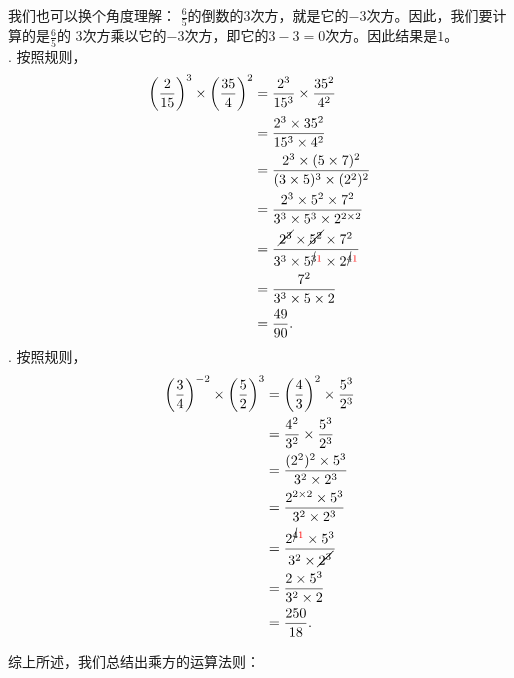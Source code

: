 \documentclass[12pt,UTF8,fontset=none]{ctexbook}
\begin{document}
\begin{so}
    我们也可以换个角度理解：
    $\frac{6}{5}$的倒数的$3$次方，就是它的$-3$次方。因此，我们要计算的是$\frac{6}{5}$的
    $3$次方乘以它的$-3$次方，即它的$3-3=0$次方。因此结果是$1$。\\
    . 按照规则，
    \begin{align*}
        \left(\frac{2}{15}\right)^3\times \left(\frac{35}{4}\right)^2 &= \frac{2^3}{15^3}\times \frac{35^2}{4^2} \\
        &= \frac{2^3\times 35^2}{15^3\times 4^2} \\
        &= \frac{2^3\times (5\times 7)^2}{(3\times 5)^3\times (2^2)^2} \\
        &= \frac{2^3\times 5^2 \times 7^2}{3^3\times 5^{3} \times 2^{2\times 2}} \\
        &= \frac{\cancel{2^3}\times \cancel{5^2} \times 7^2}{3^3\times 5^{\cancel{3}{\color{red} 1}} \times 2^{\cancel{4}{\color{red} 1}}} \\
        &= \frac{7^2}{3^3\times 5 \times 2} \\
        &= \frac{49}{90}.
    \end{align*}
    . 按照规则，
    \begin{align*}
        \left(\frac{3}{4}\right)^{-2}\times \left(\frac{5}{2}\right)^3 &= \left(\frac{4}{3}\right)^2\times \frac{5^3}{2^3} \\
        &= \frac{4^2}{3^2} \times \frac{5^3}{2^3} \\
        &= \frac{(2^2)^2 \times 5^3}{3^2\times 2^3} \\
        &= \frac{2^{2\times 2} \times 5^3}{3^2 \times 2^3} \\
        &= \frac{2^{\cancel{4}{\color{red} 1}} \times 5^3}{3^2 \times \cancel{2^3}} \\
        &= \frac{2 \times 5^3}{3^2\times 2} \\
        &= \frac{250}{18}.
    \end{align*}
\end{so}

综上所述，我们总结出乘方的运算法则：
\begin{center}
\end{center}
\end{document}
